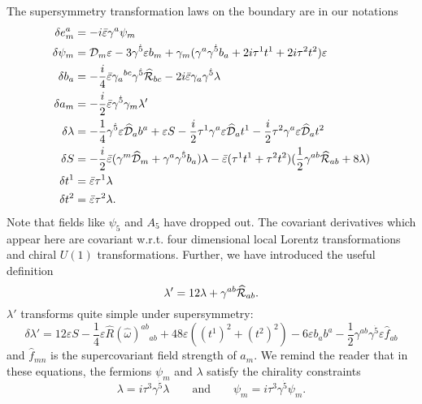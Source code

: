 \documentclass[a4paper,12pt, twoside]{article}
\numberwithin{equation}{section}
\begin{document}
The supersymmetry transformation laws on the boundary are in our 
notations
\begin{equation}
\begin{split}
\delta e_m^a & =  -i\bar{\varepsilon}\gamma^a\psi_m\\
\delta \psi_m & =  {\cal D}_m\varepsilon -3\gamma^{\dot{5}}\varepsilon 
b_m 
+\gamma_m(\gamma^a\gamma^{\dot{5}}b_a+2i\tau^1t^1+2i\tau^2t^2)\varepsilon\\
\delta b_a & =  
-\frac{i}{4}\bar{\varepsilon}\gamma_a{}^{bc}\gamma^{\dot{5}}\widehat{\cal 
R}_{bc}-2i\bar{\varepsilon}\gamma_a\gamma^{\dot{5}}\lambda\\
\delta a_m & =  
-\frac{i}{2}\bar{\varepsilon}\gamma^{\dot{5}}\gamma_m\lambda'\\
\delta \lambda &  =  -\frac{1}{4}\gamma^{\dot{5}}\varepsilon 
\widehat{{\cal D}}_ab^a+\varepsilon S 
-\frac{i}{2}\tau^1\gamma^a\varepsilon\widehat{{\cal D}}_a t^1-\frac{i}{2}\tau^2\gamma^a\varepsilon\widehat{{\cal 
D}}_a t^2\\
\delta S & =  -\frac{i}{2}\bar{\varepsilon}(\gamma^m\widehat{{\cal 
D}}_m +\gamma^a\gamma^{\dot{5}} b_a)\lambda 
-\bar{\varepsilon}(\tau^1t^1+\tau^2t^2)(\frac{1}{2}\gamma^{ab}\widehat{\cal R}_{ab}+8 \lambda)\\
\delta t^1 & =  \bar{\varepsilon}\tau^1\lambda\\
\delta t^2 & =  \bar{\varepsilon}\tau^2\lambda.
\end{split}\label{mino}
\end{equation}
Note that fields like $\psi_5$ and $A_5$ have dropped out. The 
covariant derivatives which appear here are covariant w.r.t. four dimensional 
local Lorentz transformations and chiral $U(1)$ transformations. 
Further, we have introduced the useful definition \cite{Sohnius:1983xs}
\[
\lambda'=12\lambda+\gamma^{ab}\widehat{\cal R}_{ab}.
\] 
$\lambda'$ transforms quite simple under supersymmetry:
\[
\delta \lambda'=12\varepsilon S-\frac{1}{4}\varepsilon 
\widehat{R}(\widehat{\omega})^{ab}{}_{ab}+48 \varepsilon ((t^1)^2+(t^2)^2)-6\varepsilon 
b_ab^a-\frac{1}{2}\gamma^{ab}\gamma^{\dot{5}}\varepsilon\widehat{f}_{ab}
\]
and $\widehat{f}_{mn}$ is the supercovariant field strength of $a_m$. 
We remind the reader that in these equations, the fermions $\psi_m$ and 
$\lambda$ satisfy the chirality constraints 
\[
\lambda=i\tau^3\gamma^{\dot{5}}\lambda\qquad\mbox{and}\qquad  
\psi_m=i\tau^3\gamma^{\dot{5}}\psi_m.
\]
\end{document}
